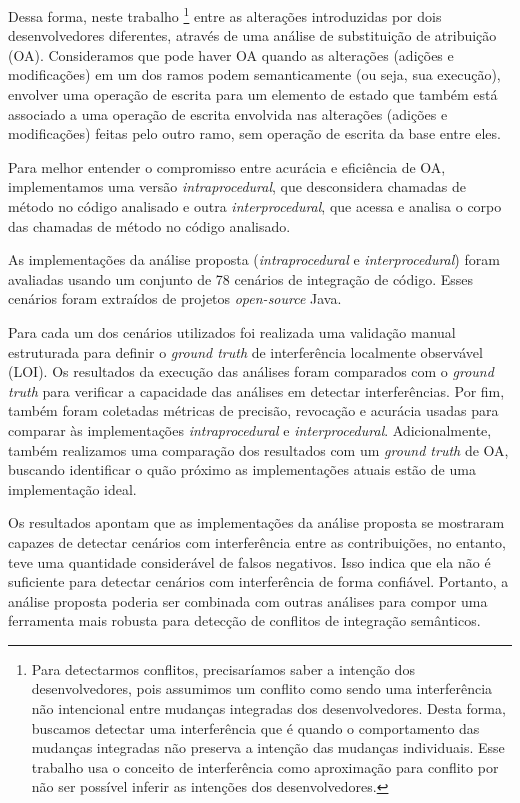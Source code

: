 Dessa forma, neste trabalho \footnote{Para detectarmos conflitos, precisaríamos saber a intenção dos desenvolvedores, pois assumimos um conflito como sendo uma interferência não intencional entre mudanças integradas dos desenvolvedores. Desta forma, buscamos detectar uma interferência que é quando o comportamento das mudanças integradas não preserva a intenção das mudanças individuais. Esse trabalho usa o conceito de interferência como aproximação para conflito por não ser possível inferir as intenções dos desenvolvedores.} entre as alterações introduzidas por dois desenvolvedores diferentes, através de uma análise de substituição de atribuição (OA). Consideramos que pode haver OA quando as alterações (adições e modificações) em um dos ramos podem semanticamente (ou seja, sua execução), envolver uma operação de escrita para um elemento de estado que também está associado a uma operação de escrita envolvida nas alterações (adições e modificações) feitas pelo outro ramo, sem operação de escrita da base entre eles.

Para melhor entender o compromisso entre acurácia e eficiência de OA, implementamos uma versão \emph{intraprocedural}, que desconsidera chamadas de método no código analisado e outra \emph{interprocedural}, que  acessa e analisa o corpo das chamadas de método no código analisado.

As implementações da análise proposta (\emph{intraprocedural} e \emph{interprocedural}) foram avaliadas usando um conjunto de 78 cenários de integração de código. Esses cenários foram extraídos de projetos \emph{open-source} Java.

Para cada um dos cenários utilizados foi realizada uma validação manual estruturada para definir o \emph{ground truth} de interferência localmente observável (LOI). Os resultados da execução das análises foram comparados com o \emph{ground truth} para verificar a capacidade das análises em detectar interferências. Por fim, também foram coletadas métricas de precisão, revocação e acurácia usadas para comparar às implementações \emph{intraprocedural} e \emph{interprocedural}. Adicionalmente, também realizamos uma comparação dos resultados com um \emph{ground truth} de OA, buscando identificar o quão próximo as implementações atuais estão de uma implementação ideal.    

Os resultados apontam que as implementações da análise proposta se mostraram capazes de detectar cenários com interferência entre as contribuições, no entanto, teve uma quantidade considerável de falsos negativos. Isso indica que ela não é suficiente para detectar cenários com interferência de forma confiável. Portanto, a análise proposta poderia ser combinada com outras análises para compor uma ferramenta mais robusta para detecção de conflitos de integração semânticos. 